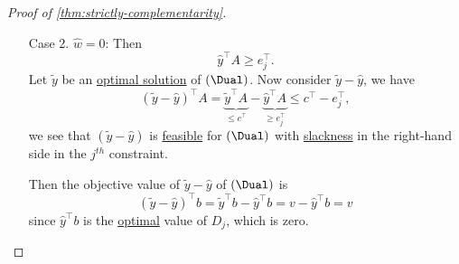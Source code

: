 \begin{proof}[Proof of \autoref{thm:strictly-complementarity}]
\begin{enumerate}
\begin{enumerate}
\[\begin{split}
				            \end{split}
			            \]
			            Note that the \hyperref[def:optimal-solution]{optimal} value of \(D_{j}\) is zero since the \hyperref[def:optimal-solution]{optimal} value of \(P_{j}\) is zero. Then
			            \[
				            \begin{split}
					                     & \hat{w} v + \hat{y}^{\top}b = 0                           \\
					            \implies & -v + \left( \frac{\hat{y}^{\top}}{-\hat{w}} \right) b = 0 \\
					            \implies & \hat{\hat{y}}^{\top}b = v                                 \\
					            \implies & \hat{\hat{y}} \text{ is optimal for }D.
				            \end{split}
			            \]
			      \item[Case 2.] \(\hat{w} = 0\): Then
			            \[
				            \hat{y}^{\top}A\geq e_{j}^{\top}.
			            \]
			            Let \(\widetilde{y}\) be an \hyperref[def:optimal-solution]{optimal solution} of \((\Dual)\). Now consider \(\widetilde{y} - \hat{y}\), we have
			            \[
				            \left(\widetilde{y} - \hat{y}\right)^{\top}A = \underbrace{\widetilde{y}^{\top}A}_{\leq c^{\top}} - \underbrace{\hat{y}^{\top}A}_{\geq e_{j}^{\top}} \leq c^{\top} - e_{j}^{\top},
			            \]
			            we see that \(\left( \widetilde{y} - \hat{y} \right) \) is \hyperref[def:feasible-solution]{feasible} for \((\Dual)\) with \hyperref[def:slack-variable]{slackness} in the right-hand side in the \(j^{th}\) constraint.

			            Then the objective value of \(\widetilde{y}-\hat{y}\) of \((\Dual)\) is
			            \[
				            \left( \widetilde{y}-\hat{y} \right)^{\top}b = \widetilde{y}^{\top}b - \hat{y}^{\top}b = v - \hat{y}^{\top}b = v
			            \]
			            since \(\hat{y}^{\top}b\) is the \hyperref[def:optimal-solution]{optimal} value of \(D_{j}\), which is zero.
		      \end{enumerate}
	\end{enumerate}


\end{proof}
